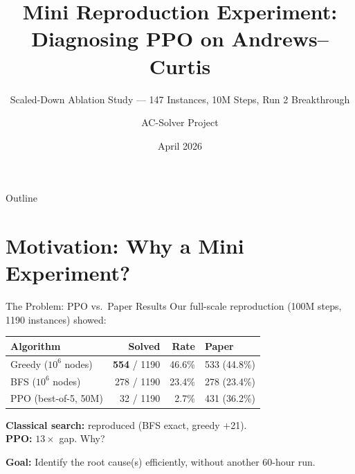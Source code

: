 \documentclass[aspectratio=169,11pt]{beamer}
\title{Mini Reproduction Experiment:\\Diagnosing PPO on Andrews--Curtis}
\subtitle{Scaled-Down Ablation Study --- 147 Instances, 10M Steps, Run 2 Breakthrough}
\author{AC-Solver Project}
\date{April 2026}
\begin{document}
\maketitle

\begin{frame}{Outline}
  \tableofcontents
\end{frame}

\section{Motivation: Why a Mini Experiment?}

\begin{frame}{The Problem: PPO vs.\ Paper Results}
  Our full-scale reproduction (100M steps, 1190 instances) showed:

  \begin{center}
  \begin{tabular}{lrrl}
    \toprule
    \textbf{Algorithm} & \textbf{Solved} & \textbf{Rate} & \textbf{Paper} \\
    \midrule
    Greedy ($10^6$ nodes)     & \textbf{554} / 1190 & 46.6\% & 533 (44.8\%) \\
    BFS ($10^6$ nodes)        & 278 / 1190           & 23.4\% & 278 (23.4\%) \\
    PPO (best-of-5, 50M)      & \textcolor{bad}{32} / 1190 & \textcolor{bad}{2.7\%} & \textcolor{good}{431 (36.2\%)} \\
    \bottomrule
  \end{tabular}
  \end{center}

  \bigskip
  \textbf{Classical search:} reproduced (BFS exact, greedy $+$21).\\
  \textbf{PPO:} $13\times$ gap.  \alert{Why?}

  \bigskip
  \textbf{Goal:} Identify the root cause(s) efficiently, without another 60-hour run.
\end{frame}
\end{document}
